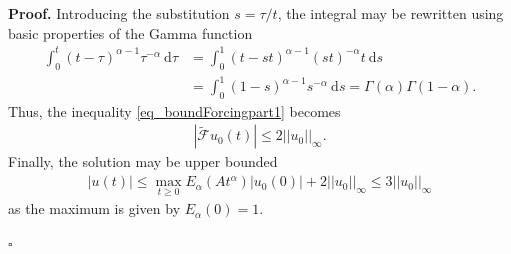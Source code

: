 \documentclass{svproc}
\renewenvironment{proof}[1][Proof]{\par\noindent\textbf{#1.} }{\hfill$\square$\par\vspace{1em}}
\newcommand{\dsomething}[1]{\mathrm{d}#1}
\begin{document}
{\begin{proof}
	Introducing the substitution $s = \tau /t$, the integral may be rewritten using basic properties of the Gamma function
	\begin{align}
	\int_0^t (t-\tau)^{\alpha-1}  \tau^{-\alpha} ~\dsomething{\tau} &= \int_0^1 (t-s t)^{\alpha-1}  (st)^{-\alpha} t~\dsomething{s}\\
		&= \int_0^1 (1-s)^{\alpha-1}  s^{-\alpha} ~\dsomething{s} =\Gamma(\alpha)\Gamma(1-\alpha).
	\end{align}
	Thus, the inequality \eqref{eq_boundForcingpart1} becomes
	\begin{align}
		\left| \tilde {\mathcal F }u_0 (t)\right|\leq 2||u_0||_\infty.
	\end{align} Finally, the solution may be upper bounded
	\begin{align} \label{eq_boundStability}
		|u(t)|\leq \max_{t\geq 0}E_\alpha(At^\alpha) |u_0(0)| + 2||u_0||_\infty \leq 3||u_0||_\infty
	\end{align}
	as the maximum is given by $E_\alpha(0) = 1$.
	

\end{proof}}
\end{document}
